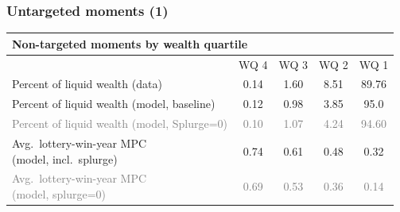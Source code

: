 \documentclass[pdflatex,aspectratio=169]{beamer}
\begin{document}
\begin{frame}
  \frametitle{Untargeted moments (1)}
  \begin{tabular}{lcccc}
    \multicolumn{5}{l}{Non-targeted moments by wealth quartile}                                                                                                        \\ \hline
                                                                  & WQ 4                   & WQ 3                   & WQ 2                   & WQ 1                    \\ \hline
    Percent of liquid wealth (data)                               & 0.14                   & 1.60                   & 8.51                   & 89.76                   \\
    Percent of liquid wealth (model, baseline)                    & 0.12                   & 0.98                   & 3.85                   & 95.0                    \\
    \textcolor{gray}{Percent of liquid wealth (model, Splurge=0)} & \textcolor{gray}{0.10} & \textcolor{gray}{1.07} & \textcolor{gray}{4.24} & \textcolor{gray}{94.60} \\
    \shortstack[l]{Avg.\ lottery-win-year MPC                                                                                                                          \\ (model, incl.\ splurge)} & 0.74 & 0.61 & 0.48 & 0.32 \\
    \shortstack[l]{\textcolor{gray}{Avg.\ lottery-win-year MPC}                                                                                                        \\ \textcolor{gray}{(model, splurge=0)}} & \textcolor{gray}{0.69} & \textcolor{gray}{0.53} & \textcolor{gray}{0.36} & \textcolor{gray}{0.14}
    \\ \hline
  \end{tabular}
\end{frame}
\end{document}
